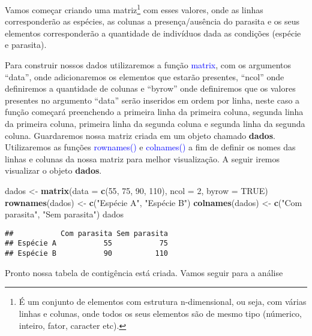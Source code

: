 \documentclass[14pt,titlepage, oneside, openany, a4paper]{book}
\newenvironment{Shaded}{\begin{snugshade}}{\end{snugshade}}
\newcommand{\DataTypeTok}[1]{\textcolor[rgb]{0.13,0.29,0.53}{#1}}
\newcommand{\DecValTok}[1]{\textcolor[rgb]{0.00,0.00,0.81}{#1}}
\newcommand{\KeywordTok}[1]{\textcolor[rgb]{0.13,0.29,0.53}{\textbf{#1}}}
\newcommand{\NormalTok}[1]{#1}
\newcommand{\OtherTok}[1]{\textcolor[rgb]{0.56,0.35,0.01}{#1}}
\newcommand{\StringTok}[1]{\textcolor[rgb]{0.31,0.60,0.02}{#1}}
\begin{document}
Vamos começar criando uma matriz\footnote{É um conjunto de elementos com estrutura n-dimensional, ou seja, com várias linhas e colunas, onde todos os seus elementos são de mesmo tipo (númerico, inteiro, fator, caracter etc).} com esses valores, onde as linhas corresponderão as espécies, as colunas a presença/ausência do parasita e os seus elementos corresponderão a quantidade de indivíduos dada as condições (espécie e parasita).

Para construir nossos dados utilizaremos a função \textcolor{blue}{matrix}, com os argumentos ``data'', onde adicionaremos os elementos que estarão presentes, ``ncol'' onde definiremos a quantidade de colunas e ``byrow'' onde definiremos que os valores presentes no argumento ``data'' serão inseridos em ordem por linha, neste caso a função começará preenchendo a primeira linha da primeira coluna, segunda linha da primeira coluna, primeira linha da segunda coluna e segunda linha da segunda coluna. Guardaremos nossa matriz criada em um objeto chamado \textbf{dados}. Utilizaremos as funções \textcolor{blue}{rownames()} e \textcolor{blue}{colnames()} a fim de definir os nomes das linhas e colunas da nossa matriz para melhor visualização. A seguir iremos visualizar o objeto \textbf{dados}.

\begin{Shaded}
\begin{Highlighting}[]
\NormalTok{dados <-}\StringTok{ }\KeywordTok{matrix}\NormalTok{(}\DataTypeTok{data =} \KeywordTok{c}\NormalTok{(}\DecValTok{55}\NormalTok{, }\DecValTok{75}\NormalTok{, }\DecValTok{90}\NormalTok{, }\DecValTok{110}\NormalTok{), }\DataTypeTok{ncol =} \DecValTok{2}\NormalTok{, }\DataTypeTok{byrow =} \OtherTok{TRUE}\NormalTok{)}
\KeywordTok{rownames}\NormalTok{(dados) <-}\StringTok{ }\KeywordTok{c}\NormalTok{(}\StringTok{"Espécie A"}\NormalTok{, }\StringTok{"Espécie B"}\NormalTok{)}
\KeywordTok{colnames}\NormalTok{(dados) <-}\StringTok{ }\KeywordTok{c}\NormalTok{(}\StringTok{"Com parasita"}\NormalTok{, }\StringTok{"Sem parasita"}\NormalTok{)}
\NormalTok{dados}
\end{Highlighting}
\end{Shaded}

\begin{verbatim}
##           Com parasita Sem parasita
## Espécie A           55           75
## Espécie B           90          110
\end{verbatim}

Pronto nossa tabela de contigência está criada. Vamos seguir para a análise
\end{document}
